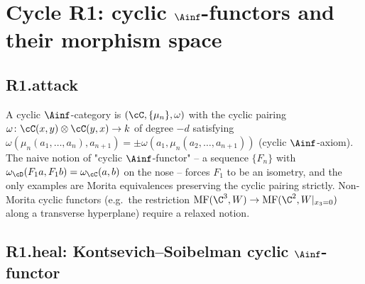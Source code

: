 \section*{Cycle R1: cyclic $\Ainf$-functors and their morphism space}

\subsection*{R1.attack}

A cyclic $\Ainf$-category is $(\cC, \{\mu_n\}, \omega)$ with the
cyclic pairing $\omega \colon \cC(x,y) \otimes \cC(y,x) \to k$ of
degree $-d$ satisfying
$\omega(\mu_n(a_1,\ldots,a_n), a_{n+1}) = \pm
\omega(a_1, \mu_n(a_2,\ldots,a_{n+1}))$ (cyclic $\Ainf$-axiom).  The
naive notion of "cyclic $\Ainf$-functor" -- a sequence $\{F_n\}$ with
$\omega_\cD(F_1 a, F_1 b) = \omega_\cC(a, b)$ on the nose -- forces
$F_1$ to be an isometry, and the only examples are Morita equivalences
preserving the cyclic pairing strictly.  Non-Morita cyclic functors
(e.g.\ the restriction $\mathrm{MF}(\C^3, W) \to \mathrm{MF}(\C^2,
W|_{x_3=0})$ along a transverse hyperplane) require a relaxed notion.

\subsection*{R1.heal: Kontsevich--Soibelman cyclic $\Ainf$-functor}

